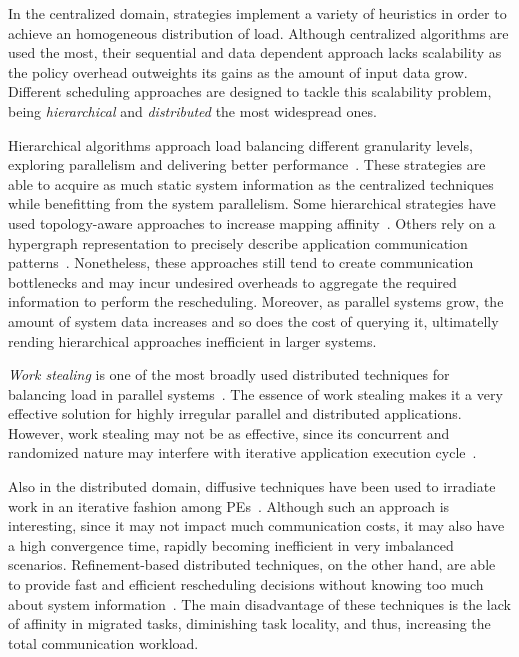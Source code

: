 In the centralized domain, strategies implement a variety of heuristics in order to achieve an homogeneous distribution of load.
Although centralized algorithms are used the most, their sequential and data dependent approach lacks scalability as the policy overhead outweights its gains as the amount of input data grow.
Different scheduling approaches are designed to tackle this scalability problem, being \textit{hierarchical} and \textit{distributed} the most widespread ones.

Hierarchical algorithms approach load balancing different granularity levels, exploring parallelism and delivering better performance~\cite{hybrid}.
These strategies are able to acquire as much static system information as the centralized techniques while benefitting from the system parallelism.
Some hierarchical strategies have used topology-aware approaches to increase mapping affinity~\cite{hwtopo,Jeannot2016topo}.
Others rely on a hypergraph representation to precisely describe application communication patterns~\cite{ZoltanParHypRepart07}.
Nonetheless, these approaches still tend to create communication bottlenecks and may incur undesired overheads to aggregate the required information to perform the rescheduling.
Moreover, as parallel systems grow, the amount of system data increases and so does the cost of querying it, ultimatelly rending hierarchical approaches inefficient in larger systems.

\textit{Work stealing} is one of the most broadly used distributed techniques for balancing load in parallel systems~\cite{Yang18wssurvey,Janjic2013}.
The essence of work stealing makes it a very effective solution for highly irregular parallel and distributed applications.
However, work stealing may not be as effective, since its concurrent and randomized nature may interfere with iterative application execution cycle~\cite{Beri2015hetws}.

Also in the distributed domain, diffusive techniques have been used to irradiate work in an iterative fashion among PEs~\cite{diffus}.
Although such an approach is interesting, since it may not impact much communication costs, it may also have a high convergence time, rapidly becoming inefficient in very imbalanced scenarios.
Refinement-based distributed techniques, on the other hand, are able to provide fast and efficient rescheduling decisions without knowing too much about system information~\cite{grapevine}.
The main disadvantage of these techniques is the lack of affinity in migrated tasks, diminishing task locality, and thus, increasing the total communication workload.


